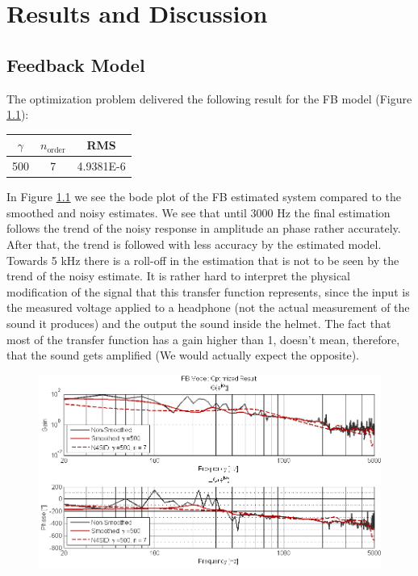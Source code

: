 \section{Results and Discussion}

\subsection{Feedback Model}
The optimization problem delivered the following result for the FB model (Figure \ref{}):

\begin{table}[H]
\centering
    \begin{tabular}{c|c|c}
    
    $\gamma$ & $n_\text{order}$ & RMS \\ \hline
    500      & 7                &  4.9381E-6   \\ 
    \end{tabular}
\end{table}

In Figure \ref{} we see the bode plot of the FB estimated system compared to the smoothed and noisy estimates. We see that until 3000 Hz the final estimation follows the trend of the noisy response in amplitude an phase rather accurately. After that, the trend is followed with less accuracy by the estimated model. Towards 5 kHz there is a roll-off in the estimation that is not to be seen by the trend of the noisy estimate. It is rather hard to interpret the physical modification of the signal that this transfer function represents, since the input is the measured voltage applied to a headphone (not the actual measurement of the sound it produces) and the output the sound inside the helmet. The fact that most of the transfer function has a gain higher than 1, doesn't mean, therefore, that the sound gets amplified (We would actually expect the opposite).  \\


\begin{figure}[H]
\centering
\includegraphics[width=1.0\textwidth]{pics/results_FB}
\caption{}
\label{pic:}
\end{figure}

